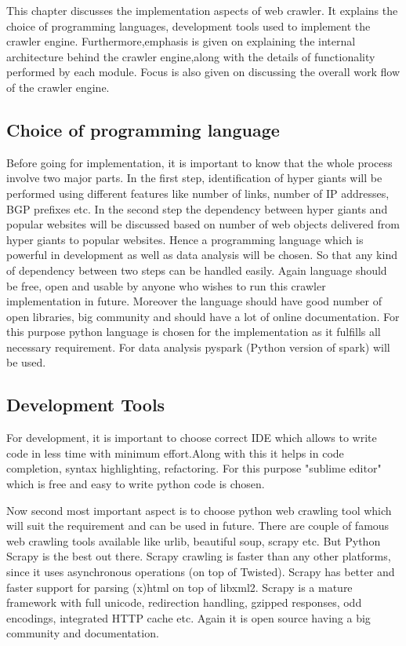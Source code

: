 This chapter discusses the implementation aspects of web crawler. It explains the
choice of programming languages, development tools used to implement the crawler engine. Furthermore,emphasis is given on explaining the internal architecture behind the crawler engine,along with the details of functionality performed by each module. Focus is also given on discussing the overall work flow of the crawler engine. 
\subsection{Choice of programming language}
Before going for implementation, it is important to know that the whole process involve two major parts. In the first step, identification of hyper giants will be performed using different features like number of links, number of IP addresses, BGP prefixes etc. In the second step the dependency between hyper giants and popular websites will be discussed based on number of web objects delivered from hyper giants to popular websites. Hence a programming language which is powerful in development as well as data analysis will be chosen. So that any kind of dependency between two steps can be handled easily. Again language should be free, open and usable by anyone who wishes to run this crawler implementation in future. Moreover the language should have good number of open libraries, big community and should have a lot of online documentation. For this purpose python language is chosen for the implementation as it fulfills all necessary requirement. For data analysis pyspark (Python version of spark) will be used.

\subsection{Development Tools}
For development, it is important to choose correct IDE which allows to write code in less time with minimum effort.Along with this it helps in code completion, syntax highlighting, refactoring. For this purpose "sublime editor" which is free and easy to write python code is chosen.

Now second most important aspect is to choose python web crawling tool which will suit the requirement and can be used in future. There are couple of famous web crawling tools available like urlib, beautiful soup, scrapy etc. But Python Scrapy is the best out there. Scrapy crawling is faster than any other platforms, since it uses asynchronous operations (on top of Twisted). Scrapy has better and faster support for parsing (x)html on top of libxml2. Scrapy is a mature framework with full unicode, redirection handling, gzipped responses, odd encodings, integrated HTTP cache etc. Again it is open source having a big community and documentation.

